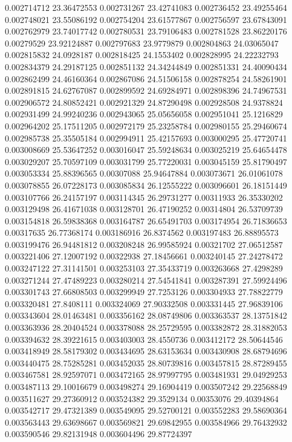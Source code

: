 0.002714712	23.36472553
0.002731267	23.42741083
0.002736452	23.49255464
0.002748021	23.55086192
0.002754204	23.61577867
0.002756597	23.67843091
0.002762979	23.74017742
0.002780531	23.79106483
0.002781528	23.86220176
0.00279529	23.92124887
0.002797683	23.9779879
0.002804863	24.03065047
0.002815832	24.0928187
0.002818425	24.1553402
0.002828995	24.22232793
0.002834379	24.29187125
0.002851132	24.34244849
0.002851331	24.40090434
0.002862499	24.46160364
0.002867086	24.51506158
0.002878254	24.58261901
0.002891815	24.62767087
0.002899592	24.69284971
0.002898396	24.74967531
0.002906572	24.80852421
0.002921329	24.87290498
0.002928508	24.9378824
0.002931499	24.99240236
0.002943065	25.05656058
0.002951041	25.1216829
0.002964202	25.17511205
0.002972179	25.23258784
0.002980155	25.29460674
0.002985738	25.35505184
0.002994911	25.42157693
0.003000295	25.47720741
0.003008669	25.53647252
0.003016047	25.59248634
0.003025219	25.64654478
0.003029207	25.70597109
0.003031799	25.77220031
0.003045159	25.81790497
0.003053334	25.88396565
0.00307088	25.94647884
0.003073671	26.01061078
0.003078855	26.07228173
0.003085834	26.12555222
0.003096601	26.18151449
0.003107766	26.24157197
0.003114345	26.29731277
0.00311933	26.35330202
0.003129498	26.41671038
0.003128701	26.47190252
0.00314804	26.53709739
0.003154818	26.59838368
0.003164787	26.65491703
0.003174954	26.71836653
0.00317635	26.77368174
0.003186916	26.8374562
0.003197483	26.88895573
0.003199476	26.94481812
0.003208248	26.99585924
0.00321702	27.06512587
0.003221406	27.12007192
0.00322938	27.18456661
0.003240145	27.24278472
0.003247122	27.31141501
0.003253103	27.35433719
0.003263668	27.4298289
0.003271244	27.47489223
0.003280214	27.54541841
0.003287391	27.59924496
0.003301743	27.66808503
0.003299949	27.7253126
0.003304933	27.78822779
0.003320481	27.8408111
0.003324069	27.90332508
0.003331445	27.96839106
0.003343604	28.01463481
0.003356162	28.08749806
0.003363537	28.13751842
0.003363936	28.20404524
0.003378088	28.25729595
0.003382872	28.31882053
0.003394632	28.39221615
0.003403003	28.4550736
0.003412172	28.50644546
0.003418949	28.58179302
0.003434695	28.63153634
0.003430908	28.68794696
0.003440475	28.75285281
0.003452035	28.80739816
0.003457815	28.87289455
0.003467581	28.92597071
0.003472165	28.97997795
0.003481931	29.04929253
0.003487113	29.10016679
0.003498274	29.16904419
0.003507242	29.22568849
0.003511627	29.27360912
0.003524382	29.3529134
0.00353076	29.40394864
0.003542717	29.47321389
0.003549095	29.52700121
0.003552283	29.58690364
0.003563443	29.63698667
0.003569821	29.69842955
0.003584966	29.76432932
0.003590546	29.82131948
0.003604496	29.87724397
